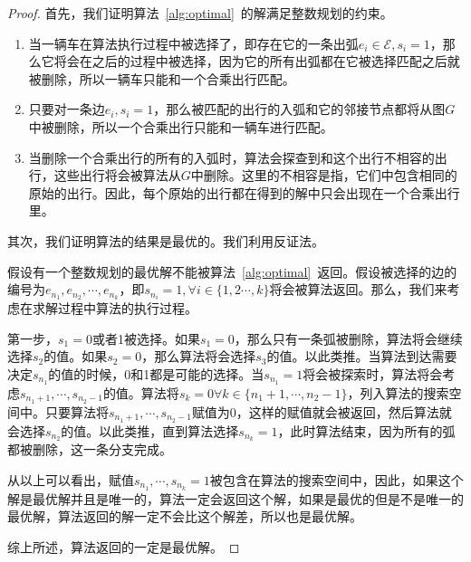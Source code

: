 \begin{proof}
首先，我们证明算法~\ref{alg:optimal}~的解满足整数规划的约束。
\begin{enumerate}
\item 当一辆车在算法执行过程中被选择了，即存在它的一条出弧$e_i\in \mathcal{E},s_i = 1$，那么它将会在之后的过程中被选择，因为它的所有出弧都在它被选择匹配之后就被删除，所以一辆车只能和一个合乘出行匹配。
\item 只要对一条边$e_i,s_i=1$，那么被匹配的出行的入弧和它的邻接节点都将从图$G$中被删除，所以一个合乘出行只能和一辆车进行匹配。
\item 当删除一个合乘出行的所有的入弧时，算法会探查到和这个出行不相容的出行，这些出行将会被算法从$G$中删除。这里的不相容是指，它们中包含相同的原始的出行。因此，每个原始的出行都在得到的解中只会出现在一个合乘出行里。
\end{enumerate}
\par
其次，我们证明算法的结果是最优的。我们利用反证法。
\par
假设有一个整数规划的最优解不能被算法~\ref{alg:optimal}~返回。假设被选择的边的编号为$e_{n_1},e_{n_2},\cdots,e_{n_k}$，即$s_{n_i}=1,\forall i\in \{1,2\cdots,k\}$将会被算法返回。那么，我们来考虑在求解过程中算法的执行过程。
\par
第一步，$s_1 = 0$或者1被选择。如果$s_1 = 0$，那么只有一条弧被删除，算法将会继续选择$s_2$的值。如果$s_2 = 0$，那么算法将会选择$s_3$的值。以此类推。当算法到达需要决定$s_{n_1}$的值的时候，0和1都是可能的选择。当$s_{n_1}=1$将会被探索时，算法将会考虑$s_{n_1+1},\cdots,s_{n_2-1}$的值。算法将$s_k=0\forall k\in \{n_1+1,\cdots,n_2-1\}$，列入算法的搜索空间中。只要算法将$s_{n_1+1},\cdots,s_{n_2-1}$赋值为0，这样的赋值就会被返回，然后算法就会选择$s_{n_2}$的值。以此类推，直到算法选择$s_{n_k}=1$，此时算法结束，因为所有的弧都被删除，这一条分支完成。
\par
从以上可以看出，赋值$s_{n_1},\cdots,s_{n_k}=1$被包含在算法的搜索空间中，因此，如果这个解是最优解并且是唯一的，算法一定会返回这个解，如果是最优的但是不是唯一的最优解，算法返回的解一定不会比这个解差，所以也是最优解。
\par
综上所述，算法返回的一定是最优解。
\end{proof}

